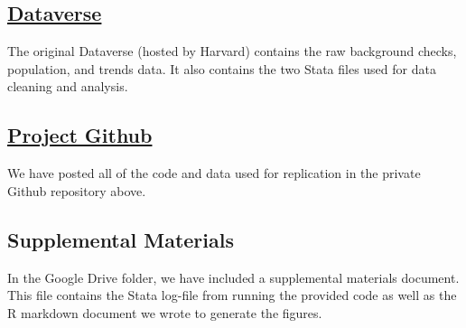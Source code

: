 \documentclass[12pt]{article}%
\begin{document}
\subsection*{\href{https://dataverse.harvard.edu/dataset.xhtml?persistentId=doi:10.7910/DVN/EVLKBN}{Dataverse}} 
The original Dataverse (hosted by Harvard) contains the raw background checks, population, and trends data. It also contains the two Stata files used for data cleaning and analysis. 
\subsection*{\href{https://github.com/dliu18/firearms-replication}{Project Github}}
We have posted all of the code and data used for replication in the private Github repository above. 
\subsection*{Supplemental Materials}
In the Google Drive folder, we have included a supplemental materials document. This file contains the Stata log-file from running the provided code as well as the R markdown document we wrote to generate the figures. 
\end{document}
